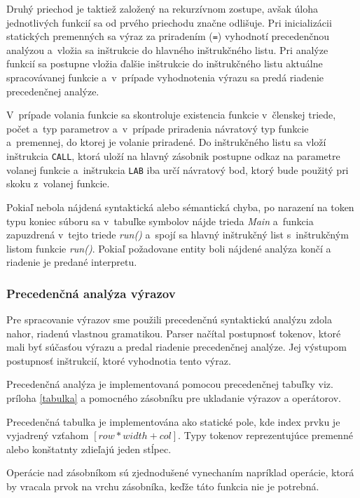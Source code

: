 \documentclass[11pt,a4paper]{article}
\begin{document}
	Druhý priechod je taktiež založený na rekurzívnom zostupe, avšak úloha
	jednotlivých funkcií sa od prvého priechodu značne odlišuje.
	Pri inicializácii statických premenných sa výraz za priradením (\texttt{=})
	vyhodnotí precedenčnou analýzou a~vložia sa inštrukcie do hlavného
	inštrukčného listu. Pri analýze funkcií sa postupne vložia ďalšie inštrukcie
	do inštrukčného listu aktuálne spracovávanej funkcie a~v~prípade vyhodnotenia
	výrazu  sa predá riadenie precedenčnej analýze.

	V~prípade volania funkcie sa skontroluje existencia funkcie v~členskej
	triede, počet a~typ parametrov a~v~prípade priradenia  návratový typ
	funkcie a~premennej, do ktorej je volanie priradené. Do inštrukčného
	listu sa vloží inštrukcia \texttt{CALL}, ktorá uloží na hlavný zásobnik
	postupne odkaz na parametre volanej funkcie a~inštrukcia \texttt{LAB}
	iba určí návratový bod, ktorý bude použitý pri skoku z~volanej funkcie.

	Pokiaľ nebola nájdená syntaktická alebo sémantická chyba, po narazení na
	token typu koniec súboru sa v~tabuľke symbolov nájde trieda \emph{Main}
	a~funkcia zapuzdrená v~tejto triede \emph{run()} a~spojí sa hlavný inštrukčný
	list s~inštrukčným listom funkcie \emph{run()}. Pokiaľ požadovane entity
	boli nájdené analýza končí a riadenie je predané interpretu.

	\subsubsection{Precedenčná analýza výrazov}
	\label{precedencna analyza}

	Pre spracovanie výrazov sme použili precedenčnú syntaktickú analýzu zdola nahor,
    riadenú vlastnou gramatikou.
	Parser načítal postupnosť tokenov, ktoré mali byť súčasťou výrazu a predal
	riadenie precedenčnej analýze. Jej výstupom postupnosť inštrukcií, ktoré vyhodnotia tento výraz.

	Precedenčná analýza je implementovaná pomocou precedenčnej tabuľky viz.
	príloha \ref{tabulka} a pomocného zásobníku pre ukladanie výrazov a operátorov.

	Precedenčná tabulka je implementována ako statické pole, kde index prvku je vyjadrený vzťahom $[row * width + col]$.
	Typy tokenov reprezentujúce premenné alebo konštatnty zdieľajú jeden stĺpec.

	Operácie nad zásobníkom sú zjednodušené vynechaním napríklad operácie, ktorá by
    vracala prvok na vrchu zásobníka, keďže táto funkcia nie je potrebná.
\end{document}
